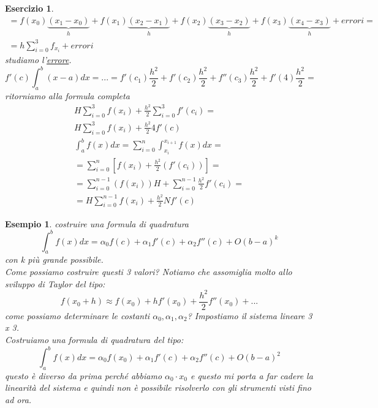 \documentclass[a4paper, portrait]{book}
\numberwithin{equation}{chapter} %
\newtheorem{exercize}{Esercizio}
\newtheorem{example}{Esempio}
\begin{document}
\begin{exercize}
\begin{gather}
        = f(x_0) \underbrace{(x_1-x_0)}_h + f(x_1)\underbrace{(x_2 - x_1)}_h + f(x_2) \underbrace{(x_3 - x_2)}_{h} + f(x_3)\underbrace{(x_4 - x_3)}_{h} + errori = \\
        = h \sum_{i= 0}^{3}f_{x_i} + errori
    \end{gather}
    studiamo l'\underline{errore}.
    \begin{equation}
        f'(c) \int_a^b(x-a) dx = ... = f'(c_1) \frac{h^2}{2} + f'(c_2)\frac{h^2}{2} + f''(c_3) \frac{h^2}{2} + f'(4) \frac{h^2}{2} = 
    \end{equation}
    ritorniamo alla formula completa
    \begin{gather}
        H \sum_{i = 0}^{3}f(x_i) + \frac{h^2}{2}\sum_{i=0}^{3} f'(c_i) = \\
        H \sum_{i = 0}^{3}f(x_i) + \frac{h^2}{2}4f'(c)\\
        \int_a^b f(x) dx = \sum_{i=0}^{n} \int_{x_i}^{x_{i+1}}f(x) dx = \\
        = \sum_{i=0}^n [f(x_i)+\frac{h^2}{2}(f'(c_i))] = \\
        = \sum_{i=0}^{n-1}(f(x_i)) H + \sum_{i = 0}^{n-1} \frac{h^2}{2}f'(c_i) = \\
        = H \sum_{i = 0}^{n-1}f(x_i) + \frac{h^2}{2}Nf'(c)
    \end{gather}
\end{exercize}
\begin{example}
    costruire una formula di quadratura
    \begin{equation}
        \int_a^b f(x) dx = \alpha_0 f(c) + \alpha_1f'(c) + \alpha_2 f''(c) + O(b-a)^k
    \end{equation}
    con k più grande possibile.\\
    Come possiamo costruire questi 3 valori? Notiamo che assomiglia molto allo sviluppo di Taylor del tipo:
    \begin{equation}
        f(x_0 + h) \approx f(x_0) + hf'(x_0) + \frac{h^2}{2}f''(x_0) + ...
    \end{equation}
    come possiamo determinare le costanti $\alpha_0, \alpha_1, \alpha_2$? Impostiamo il sistema lineare 3 x 3.\\
    Costruiamo una formula di quadratura del tipo:
    \begin{equation}
        \int_a^b f(x) dx = \alpha_0 f(x_0) + \alpha_1f'(c) + \alpha_2f''(c) + O(b-a)^2
    \end{equation}
    questo è diverso da prima perché abbiamo $\alpha_0 \cdot x_0$ e questo mi porta a far cadere la linearità del sistema e quindi non è possibile risolverlo con gli strumenti visti fino ad ora.
\end{example}
\end{document}
